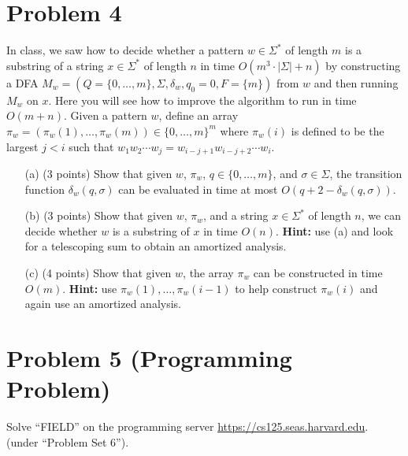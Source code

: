\documentclass[12pt]{article}
\begin{document}
\section*{Problem 4}

In class, we saw how to decide whether a pattern $w\in \Sigma^*$ of length $m$ is a substring of a string $x\in \Sigma^*$ of length $n$ in time $O(m^3\cdot |\Sigma|+n)$ by constructing a DFA $M_w=(Q=\{0,\ldots,m\},\Sigma,\delta_w,q_0=0,F=\{m\})$ from $w$ and then running $M_w$ on $x$.  Here you will see how to improve the algorithm to run in time $O(m+n)$.    Given a pattern $w$, define an array $\pi_w=(\pi_w(1),\ldots,\pi_w(m))\in \{0,\ldots,m\}^{m}$ where
    $\pi_w(i)$ is defined to be the largest $j<i$ such that
    $w_1w_2\cdots w_j = w_{i-j+1}w_{i-j+2}\cdots w_i$.
\begin{itemize}
\item[(a)] (3 points) Show that given $w$, $\pi_w$, $q\in \{0,\ldots,m\}$, and $\sigma\in \Sigma$, the transition function $\delta_w(q,\sigma)$ can be evaluated in time at most $O(q+2-\delta_w(q,\sigma))$.
\item[(b)] (3 points) Show that given $w$, $\pi_w$, and a string $x\in \Sigma^*$ of length $n$, we can decide whether $w$ is a substring of $x$ in time $O(n)$.  \textbf{Hint:} use (a) and look for a telescoping sum to obtain an amortized analysis.
\item[(c)] (4 points) Show that given $w$, the array $\pi_w$ can be constructed in time $O(m)$. \textbf{Hint:} use $\pi_w(1),\ldots,\pi_w(i-1)$ to help construct $\pi_w(i)$ and again use an amortized analysis.
\end{itemize}

\section*{Problem 5 (Programming Problem)}
Solve ``FIELD'' on the programming server \url{https://cs125.seas.harvard.edu}.\\
(under ``Problem Set 6'').
\end{document}
